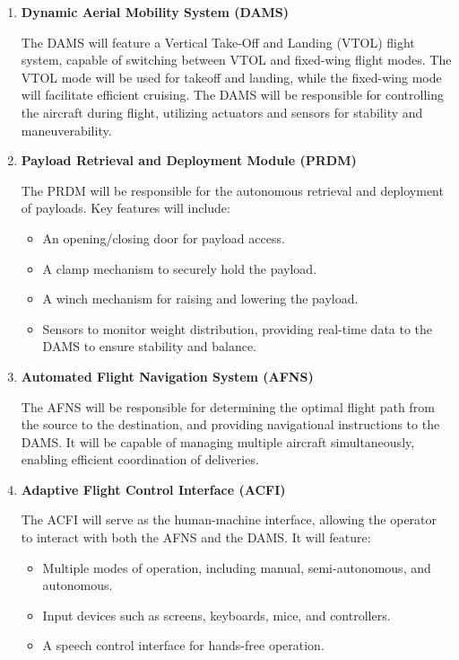 \documentclass[12pt]{article}
\begin{document}
\begin{enumerate}[label=\arabic*.] %
    \item \textbf{Dynamic Aerial Mobility System (DAMS)}  
    
    The DAMS will feature a Vertical Take-Off and Landing (VTOL) flight system, capable of switching between VTOL and fixed-wing flight modes. The VTOL mode will be used for takeoff and landing, while the fixed-wing mode will facilitate efficient cruising. The DAMS will be responsible for controlling the aircraft during flight, utilizing actuators and sensors for stability and maneuverability.
    
    \item \textbf{Payload Retrieval and Deployment Module (PRDM)}  
    
    The PRDM will be responsible for the autonomous retrieval and deployment of payloads. Key features will include:
    \begin{itemize}
        \item An opening/closing door for payload access.
        \item A clamp mechanism to securely hold the payload.
        \item A winch mechanism for raising and lowering the payload.
        \item Sensors to monitor weight distribution, providing real-time data to the DAMS to ensure stability and balance.
    \end{itemize}

    \item \textbf{Automated Flight Navigation System (AFNS)}  
    
    The AFNS will be responsible for determining the optimal flight path from the source to the destination, and providing navigational instructions to the DAMS. It will be capable of managing multiple aircraft simultaneously, enabling efficient coordination of deliveries.
    
    \item \textbf{Adaptive Flight Control Interface (ACFI)}  
    
    The ACFI will serve as the human-machine interface, allowing the operator to interact with both the AFNS and the DAMS. It will feature:
    \begin{itemize}
        \item Multiple modes of operation, including manual, semi-autonomous, and autonomous.
        \item Input devices such as screens, keyboards, mice, and controllers.
        \item A speech control interface for hands-free operation.
    \end{itemize}
\end{enumerate}
\end{document}
